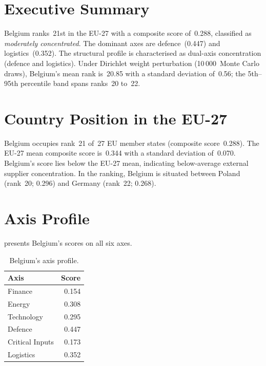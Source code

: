 \documentclass[12pt,a4paper]{article}
\begin{document}
\hypersetup{pageanchor=true}
\pagestyle{fancy}
\renewcommand{\headrulewidth}{0.4pt}


\section{Executive Summary}
\label{sec:summary}

Belgium ranks~21st in the EU-27 with a composite \ISI score of~0.288, classified as \emph{moderately concentrated}.  The dominant axes are defence~(0.447) and logistics~(0.352).  The structural profile is characterised as dual-axis concentration (defence and logistics).  Under Dirichlet weight perturbation (10\,000~Monte Carlo draws), Belgium's mean rank is~20.85 with a standard deviation of~0.56; the 5th--95th percentile band spans ranks~20 to~22.


\section{Country Position in the EU-27}
\label{sec:position}

Belgium occupies rank~21 of~27 EU member states (composite score~0.288).  The EU-27 mean composite score is~0.344 with a standard deviation of~0.070.  Belgium's score lies below the EU-27 mean, indicating below-average external supplier concentration.  In the ranking, Belgium is situated between Poland (rank~20; 0.296) and Germany (rank~22; 0.268).


\section{Axis Profile}
\label{sec:axis-profile}

 presents Belgium's scores on all six \ISI axes.

\begin{table}[htbp]
\centering\small
\caption{Belgium's \ISI axis profile.}
\label{tab:axis-profile}
\begin{tabular}{@{}lr@{}}
\toprule
\textbf{Axis} & \textbf{Score} \\
\midrule
    Finance           & 0.154 \\
    Energy            & 0.308 \\
    Technology        & 0.295 \\
    Defence           & 0.447 \\
    Critical Inputs   & 0.173 \\
    Logistics         & 0.352 \\
\bottomrule
\end{tabular}
\end{table}
\end{document}
